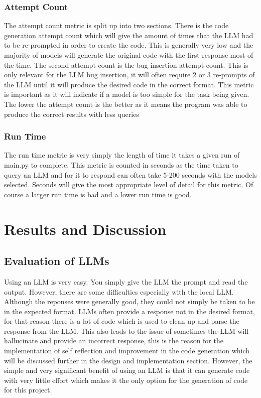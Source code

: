 \documentclass[12pt]{extarticle}
\begin{document}
\subsubsection{Attempt Count}

The attempt count metric is split up into two sections. There is the code generation attempt count which will give the amount of times that the LLM had to be re-prompted in order to create the code. This is generally very low and the majority of models will generate the original code with the first response most of the time. The second attempt count is the bug insertion attempt count. This is only relevant for the LLM bug insertion, it will often require 2 or 3 re-prompts of the LLM until it will produce the desired code in the correct format. This metric is important as it will indicate if a model is too simple for the task being given. The lower the attempt count is the better as it means the program was able to produce the correct results with less queries

\subsubsection{Run Time}

The run time metric is very simply the length of time it takes a given run of main.py to complete. This metric is counted in seconds as the time taken to query an LLM and for it to respond can often take 5-200 seconds with the models selected. Seconds will give the most appropriate level of detail for this metric. Of course a larger run time is bad and a lower run time is good.
\newpage
\section{Results and Discussion}


\subsection{Evaluation of LLMs}

Using an LLM is very easy. You simply give the LLM the prompt and read the output. However, there are some difficulties especially with the local LLM. Although the reponses were generally good, they could not simply be taken to be in the expected format. LLMs often provide a response not in the desired format, for that reason there is a lot of code which is used to clean up and parse the response from the LLM. This also leads to the issue of sometimes the LLM will hallucinate and provide an incorrect response, this is the reason for the implementation of self reflection and improvement in the code generation which will be discussed further in the design and implementation section. However, the simple and very significant benefit of using an LLM is that it can generate code with very little effort which makes it the only option for the generation of code for this project.
\end{document}
